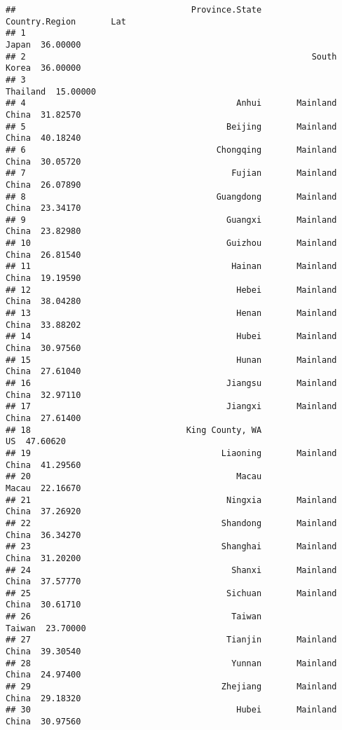 \documentclass[
]{article}
\begin{document}
\begin{verbatim}
##                                   Province.State       Country.Region       Lat
## 1                                                               Japan  36.00000
## 2                                                         South Korea  36.00000
## 3                                                            Thailand  15.00000
## 4                                          Anhui       Mainland China  31.82570
## 5                                        Beijing       Mainland China  40.18240
## 6                                      Chongqing       Mainland China  30.05720
## 7                                         Fujian       Mainland China  26.07890
## 8                                      Guangdong       Mainland China  23.34170
## 9                                        Guangxi       Mainland China  23.82980
## 10                                       Guizhou       Mainland China  26.81540
## 11                                        Hainan       Mainland China  19.19590
## 12                                         Hebei       Mainland China  38.04280
## 13                                         Henan       Mainland China  33.88202
## 14                                         Hubei       Mainland China  30.97560
## 15                                         Hunan       Mainland China  27.61040
## 16                                       Jiangsu       Mainland China  32.97110
## 17                                       Jiangxi       Mainland China  27.61400
## 18                               King County, WA                   US  47.60620
## 19                                      Liaoning       Mainland China  41.29560
## 20                                         Macau                Macau  22.16670
## 21                                       Ningxia       Mainland China  37.26920
## 22                                      Shandong       Mainland China  36.34270
## 23                                      Shanghai       Mainland China  31.20200
## 24                                        Shanxi       Mainland China  37.57770
## 25                                       Sichuan       Mainland China  30.61710
## 26                                        Taiwan               Taiwan  23.70000
## 27                                       Tianjin       Mainland China  39.30540
## 28                                        Yunnan       Mainland China  24.97400
## 29                                      Zhejiang       Mainland China  29.18320
## 30                                         Hubei       Mainland China  30.97560

\end{verbatim}
\end{document}
